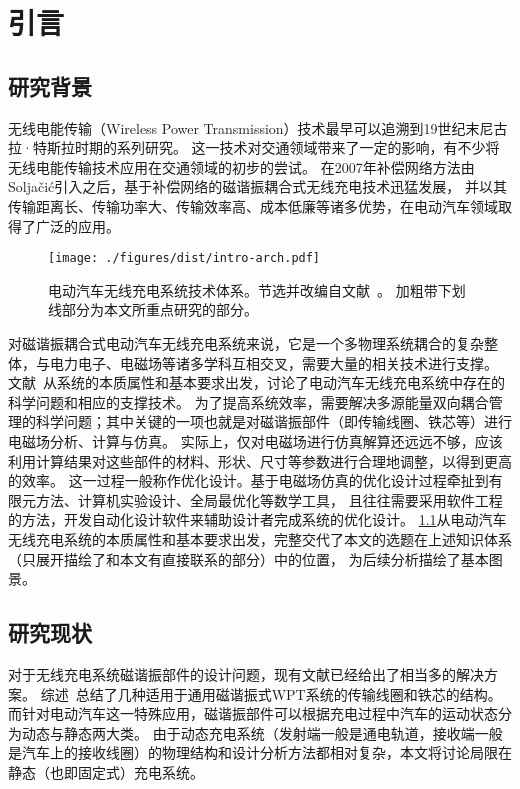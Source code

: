 \documentclass[index]{subfiles}
\begin{document}
\chapter{引言}\label{sec:intro}
\section{研究背景}
无线电能传输（Wireless Power Transmission）技术最早可以追溯到19世纪末尼古拉·特斯拉时期的系列研究\cite{barrett1894}。
这一技术对交通领域带来了一定的影响，有不少将无线电能传输技术应用在交通领域的初步的尝试\cite{eghtesadi1990}。
在2007年补偿网络方法由Solja\v{c}i\'c引入\cite{kurs2007}之后，基于补偿网络的磁谐振耦合式无线充电技术迅猛发展，
并以其传输距离长、传输功率大、传输效率高、成本低廉等诸多优势，在电动汽车领域取得了广泛的应用\cite{高大威2015}。

\begin{figure}[htb]
  \centering
  \texttt{[image: ./figures/dist/intro-arch.pdf]}
  \caption[电动汽车无线充电系统技术体系]{电动汽车无线充电系统技术体系。节选并改编自文献~。
  加粗带下划线部分为本文所重点研究的部分。\label{fig:intro-arch}}
\end{figure}

对磁谐振耦合式电动汽车无线充电系统来说，它是一个多物理系统耦合的复杂整体，与电力电子、电磁场等诸多学科互相交叉，需要大量的相关技术进行支撑。
文献~从系统的本质属性和基本要求出发，讨论了电动汽车无线充电系统中存在的科学问题和相应的支撑技术。
为了提高系统效率，需要解决多源能量双向耦合管理的科学问题；其中关键的一项也就是对磁谐振部件（即传输线圈、铁芯等）进行电磁场分析、计算与仿真。
实际上，仅对电磁场进行仿真解算还远远不够，应该利用计算结果对这些部件的材料、形状、尺寸等参数进行合理地调整，以得到更高的效率。
这一过程一般称作优化设计。基于电磁场仿真的优化设计过程牵扯到有限元方法、计算机实验设计、全局最优化等数学工具，
且往往需要采用软件工程的方法，开发自动化设计软件来辅助设计者完成系统的优化设计。
\cref{fig:intro-arch}从电动汽车无线充电系统的本质属性和基本要求出发，完整交代了本文的选题在上述知识体系（只展开描绘了和本文有直接联系的部分）中的位置，
为后续分析描绘了基本图景。

\section{研究现状}
对于无线充电系统磁谐振部件的设计问题，现有文献已经给出了相当多的解决方案。
综述~总结了几种适用于通用磁谐振式WPT系统的传输线圈和铁芯的结构。
而针对电动汽车这一特殊应用，磁谐振部件可以根据充电过程中汽车的运动状态分为动态与静态两大类\cite{赵争鸣2016}。
由于动态充电系统（发射端一般是通电轨道，接收端一般是汽车上的接收线圈）的物理结构和设计分析方法都相对复杂，本文将讨论局限在静态（也即固定式）充电系统。
\end{document}
